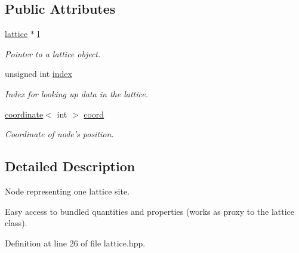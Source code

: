 \subsection*{\-Public \-Attributes}
\begin{DoxyCompactItemize}
\item 
\hypertarget{structlb_1_1node_ac4d5398ef3f3d6abd30924ecf0db3ec9}{\hyperlink{classlb_1_1lattice}{lattice} $\ast$ \hyperlink{structlb_1_1node_ac4d5398ef3f3d6abd30924ecf0db3ec9}{l}}\label{structlb_1_1node_ac4d5398ef3f3d6abd30924ecf0db3ec9}

\begin{DoxyCompactList}\small\item\em \-Pointer to a lattice object. \end{DoxyCompactList}\item 
\hypertarget{structlb_1_1node_aa5a698b4a9fe2b3f97bc80374c1153d0}{unsigned int \hyperlink{structlb_1_1node_aa5a698b4a9fe2b3f97bc80374c1153d0}{index}}\label{structlb_1_1node_aa5a698b4a9fe2b3f97bc80374c1153d0}

\begin{DoxyCompactList}\small\item\em \-Index for looking up data in the lattice. \end{DoxyCompactList}\item 
\hypertarget{structlb_1_1node_ad82c20f8bb6a9f650018a87b92866d72}{\hyperlink{structlb_1_1coordinate}{coordinate}$<$ int $>$ \hyperlink{structlb_1_1node_ad82c20f8bb6a9f650018a87b92866d72}{coord}}\label{structlb_1_1node_ad82c20f8bb6a9f650018a87b92866d72}

\begin{DoxyCompactList}\small\item\em \-Coordinate of node's position. \end{DoxyCompactList}\end{DoxyCompactItemize}


\subsection{\-Detailed \-Description}
\-Node representing one lattice site. 

\-Easy access to bundled quantities and properties (works as proxy to the lattice class). 

\-Definition at line 26 of file lattice.\-hpp.



